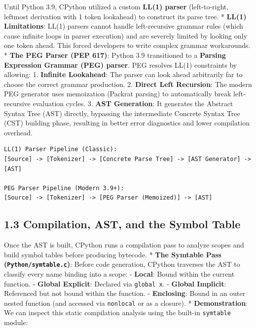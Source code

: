 Until Python 3.9, CPython utilized a custom \textbf{LL(1) parser}
(left-to-right, leftmost derivation with 1 token lookahead) to construct
its parse tree. * \textbf{LL(1) Limitations}: LL(1) parsers cannot
handle left-recursive grammar rules (which cause infinite loops in
parser execution) and are severely limited by looking only one token
ahead. This forced developers to write complex grammar workarounds. *
\textbf{The PEG Parser (PEP 617)}: Python 3.9 transitioned to a
\textbf{Parsing Expression Grammar (PEG) parser}. PEG resolves LL(1)
constraints by allowing: 1. \textbf{Infinite Lookahead}: The parser can
look ahead arbitrarily far to choose the correct grammar production. 2.
\textbf{Direct Left Recursion}: The modern PEG generator uses
memoization (Packrat parsing) to automatically break left-recursive
evaluation cycles. 3. \textbf{AST Generation}: It generates the Abstract
Syntax Tree (AST) directly, bypassing the intermediate Concrete Syntax
Tree (CST) building phase, resulting in better error diagnostics and
lower compilation overhead.

\begin{lstlisting}
LL(1) Parser Pipeline (Classic):
[Source] -> [Tokenizer] -> [Concrete Parse Tree] -> [AST Generator] -> [AST]

PEG Parser Pipeline (Modern 3.9+):
[Source] -> [Tokenizer] -> [PEG Parser (Memoized)] -> [AST]
\end{lstlisting}

\hypertarget{compilation-ast-and-the-symbol-table}{%
\subsection{1.3 Compilation, AST, and the Symbol
Table}\label{compilation-ast-and-the-symbol-table}}

Once the AST is built, CPython runs a compilation pass to analyze scopes
and build symbol tables before producing bytecode. * \textbf{The
Symtable Pass (\passthrough{\lstinline!Python/symtable.c!})}: Before
code generation, CPython traverses the AST to classify every name
binding into a scope: - \textbf{Local}: Bound within the current
function. - \textbf{Global Explicit}: Declared via
\passthrough{\lstinline!global x!}. - \textbf{Global Implicit}:
Referenced but not bound within the function. - \textbf{Enclosing}:
Bound in an outer nested function (and accessed via
\passthrough{\lstinline!nonlocal!} or as a closure). *
\textbf{Demonstration}: We can inspect this static compilation analysis
using the built-in \passthrough{\lstinline!symtable!} module:

